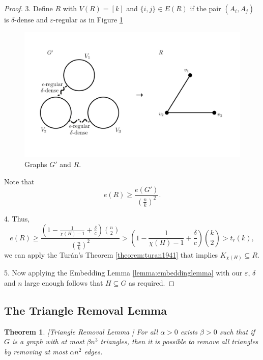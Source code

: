 \documentclass[12pt,twoside,a4paper,bibliography=totocnumbered]{book}
\numberwithin{equation}{section}
\newtheorem{theorem}             {Theorem}[section]
\theoremstyle{remark}
\begin{document}
\begin{proof}
3. Define $R$ with $V(R) = [k]$ and $\{i,j\} \in E(R) $ if  the pair $(A_i, A_j)$ is $\delta$-dense and $\varepsilon$-regular as in Figure \ref{fig:graph-G'-and-R}

\begin{figure}[H]
     \centering
     \includegraphics[scale=1.5]{Figuras/graph-G'-and-R.jpg}
     \caption{Graphs $G'$ and $R$.}
     \label{fig:graph-G'-and-R}
\end{figure}

Note that
$$e(R) \geq \frac{e(G')}{\left(\frac{n}{k}\right)^2}.$$

4. Thus,
$$e(R) \geq \frac{\left(1 - \frac{1}{\chi(H) - 1} + \frac{\delta}{c}\right) \binom{n}{2}}{\left(\frac{n}{k}\right)^2} > \left( 1 - \frac{1}{\chi(H) - 1} + \frac{\delta}{c}\right) \binom{k}{2}> t_r(k),$$
we can apply the Turán's Theorem \ref{theorem:turan1941} that implies $K_{\chi (H)} \subseteq R$.

5. Now applying the Embedding Lemma \ref{lemma:embeddinglemma} with our $\varepsilon$, $\delta$ and $n$ large enough follows that $H \subseteq G$ as required.

\end{proof}

\subsection{The Triangle Removal Lemma}
\begin{theorem}\label{lemma:triangleremoval}\emph{[}{Triangle Removal Lemma \cite{RuSz76}}\emph{]}
For all $\alpha > 0$ exists $\beta > 0$ such that if $G$ is a graph with at most $\beta n^3$ triangles, then it is possible to remove all triangles by removing at most $\alpha n^2$ edges. 
\end{theorem}
\end{document}
